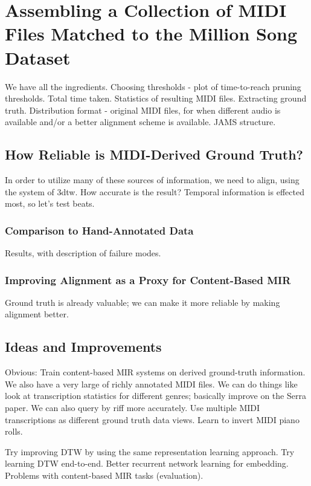 \chapter{Assembling a Collection of MIDI Files Matched to the Million Song Dataset}
\label{ch:assembling}

We have all the ingredients.
Choosing thresholds - plot of time-to-reach pruning thresholds.
Total time taken.
Statistics of resulting MIDI files.
Extracting ground truth.
Distribution format - original MIDI files, for when different audio is available and/or a better alignment scheme is available.
JAMS structure.

\section{How Reliable is MIDI-Derived Ground Truth?}

In order to utilize many of these sources of information, we need to align, using the system of 3dtw.
How accurate is the result?
Temporal information is effected most, so let's test beats.

\subsection{Comparison to Hand-Annotated Data}

Results, with description of failure modes.

\subsection{Improving Alignment as a Proxy for Content-Based MIR}

Ground truth is already valuable; we can make it more reliable by making alignment better.

\section{Ideas and Improvements}

Obvious: Train content-based MIR systems on derived ground-truth information.
We also have a very large of richly annotated MIDI files.
We can do things like look at transcription statistics for different genres; basically improve on the Serra paper.
We can also query by riff more accurately.
Use multiple MIDI transcriptions as different ground truth data views.
Learn to invert MIDI piano rolls.

Try improving DTW by using the same representation learning approach.
Try learning DTW end-to-end.
Better recurrent network learning for embedding.
Problems with content-based MIR tasks (evaluation).
